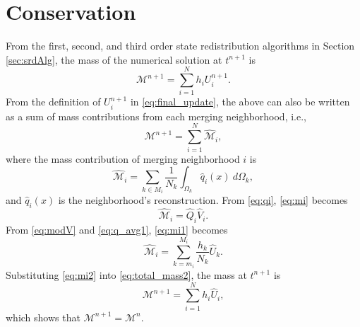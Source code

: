 \section{Conservation}
From the first, second, and third order state redistribution algorithms in Section \ref{sec:srdAlg}, the mass of the numerical solution at $t^{n+1}$ is
\begin{equation}\label{eq:total_mass}
\mathcal{M}^{n+1} = \sum^N_{i=1} h_i U^{n+1}_i.
\end{equation}
From the definition of $U^{n+1}_i$ in \eqref{eq:final_update}, the above can also be written as a sum of mass contributions from each merging neighborhood, i.e.,
\begin{equation}\label{eq:total_mass2}
\mathcal{M}^{n+1} = \sum^N_{i=1} \hat{\mathcal{M}}_i,
\end{equation}
where the mass contribution of merging neighborhood $i$ is
\begin{equation}\label{eq:mi}
\hat{\mathcal{M}}_i = \sum_{k \in M_i}\frac{1}{N_k} \int_{\Omega_k}\hat q_i(x) ~d\Omega_k,
\end{equation}
and $\hat q_i(x)$ is the neighborhood's reconstruction.  From \eqref{eq:qi}, \eqref{eq:mi} becomes
\begin{equation}\label{eq:mi1}
\hat{\mathcal{M}}_i = \hat Q_i \hat V_i.
\end{equation}
From \eqref{eq:modV} and \eqref{eq:q_avg1}, \eqref{eq:mi1} becomes
\begin{equation}\label{eq:mi2}
\hat{\mathcal{M}}_i = \sum^{M_i}_{k = m_i}\frac{h_k}{N_k} \hat U_{k}.
\end{equation}
Substituting \eqref{eq:mi2} into \eqref{eq:total_mass2}, the mass at $t^{n+1}$ is
$$
\mathcal{M}^{n+1} = \sum^{N}_{i=1} h_i \hat U_i,
$$
which shows that $\mathcal{M}^{n+1}  = \mathcal{M}^{n} $.
